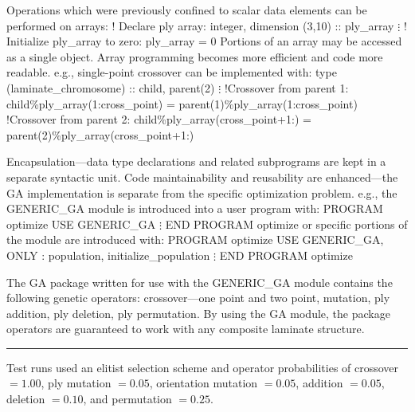\vfil \eject
\bigskip
Operations which were previously confined to scalar data elements can be 
performed on arrays:
\medskip
{\shift\vbox
{\verbatim
! Declare ply array:
integer, dimension (3,10) :: ply\_array
$\vdots$
! Initialize ply\_array to zero:
ply\_array = 0
}
}
\medskip
Portions of an array may be accessed as a single object.
Array programming becomes more efficient and code more readable.
e.g., single-point crossover can be implemented with:
\medskip
{\shift\vbox
{\verbatim
type (laminate\_chromosome) :: child, parent(2)
$\vdots$
!Crossover from parent 1:
child\%ply\_array(1:cross\_point) = parent(1)\%ply\_array(1:cross\_point)
!Crossover from parent 2:
child\%ply\_array(cross\_point+1:) = parent(2)\%ply\_array(cross\_point+1:)
}
}
\vfil\eject

\bigskip
Encapsulation---data type declarations and related subprograms are kept
in a separate syntactic unit.
\medskip
Code maintainability and reusability are enhanced---the GA implementation is
separate from the specific optimization problem.
\medskip
e.g., the GENERIC\_GA module is introduced into a user program with:
\bigskip
{\shift\vbox
{\verbatim
PROGRAM optimize
USE GENERIC\_GA
$\vdots$
END PROGRAM optimize
}
}
\medskip
or specific portions of the module are introduced with:
\medskip
{\shift\vbox
{\verbatim
PROGRAM optimize
USE GENERIC\_GA, ONLY : population, initialize\_population
$\vdots$
END PROGRAM optimize
}
}

\vfil\eject

\vfil
\vfil\eject


\bigskip
The GA package written for use with the GENERIC\_GA module contains the
following genetic operators:
\bull crossover---one point and two point,
\bull mutation,
\bull ply addition,
\bull ply deletion,
\bull  ply permutation.
\medskip
By using the GA module, the package operators are guaranteed to work
with any composite laminate structure.

\vfil\hrule
\bigskip
Test runs used an elitist selection scheme and operator probabilities of
crossover $=1.00$, ply mutation $=0.05$, orientation mutation $=0.05$,
addition $=0.05$, deletion $=0.10$, and permutation $=0.25$.
\eject

